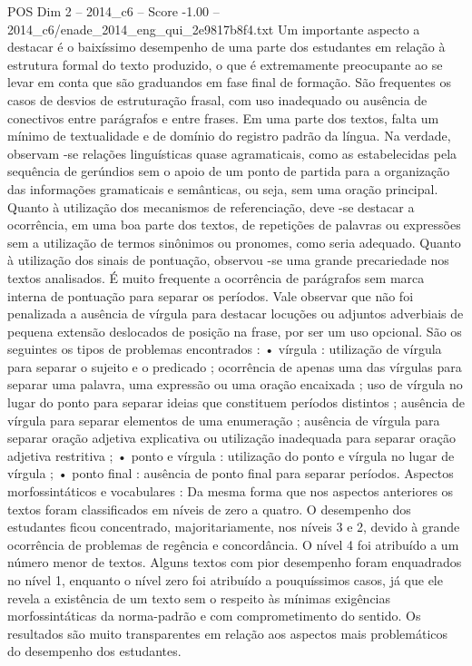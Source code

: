 \begin{textsample}{POS Dim 2 – 2014\_c6 – Score -1.00 – 2014\_c6/enade\_2014\_eng\_qui\_2e9817b8f4.txt}
Um importante aspecto a destacar é o baixíssimo desempenho de uma parte dos estudantes em relação à estrutura formal do texto produzido, o que é extremamente preocupante ao se levar em conta que são graduandos em fase final de formação.
São frequentes os casos de desvios de estruturação frasal, com uso inadequado ou ausência de conectivos entre parágrafos e entre frases.
Em uma parte dos textos, falta um mínimo de textualidade e de domínio do registro padrão da língua.
Na verdade, observam -se relações linguísticas quase agramaticais, como as estabelecidas pela sequência de gerúndios sem o apoio de um ponto de partida para a organização das informações gramaticais e semânticas, ou seja, sem uma oração principal.
Quanto à utilização dos mecanismos de referenciação, deve -se destacar a ocorrência, em uma boa parte dos textos, de repetições de palavras ou expressões sem a utilização de termos sinônimos ou pronomes, como seria adequado.
Quanto à utilização dos sinais de pontuação, observou -se uma grande precariedade nos textos analisados.
É muito frequente a ocorrência de parágrafos sem marca interna de pontuação para separar os períodos.
Vale observar que não foi penalizada a ausência de vírgula para destacar locuções ou adjuntos adverbiais de pequena extensão deslocados de posição na frase, por ser um uso opcional.
São os seguintes os tipos de problemas encontrados : • vírgula : utilização de vírgula para separar o sujeito e o predicado ; ocorrência de apenas uma das vírgulas para separar uma palavra, uma expressão ou uma oração encaixada ; uso de vírgula no lugar do ponto para separar ideias que constituem períodos distintos ; ausência de vírgula para separar elementos de uma enumeração ; ausência de vírgula para separar oração adjetiva explicativa ou utilização inadequada para separar oração adjetiva restritiva ; • ponto e vírgula : utilização do ponto e vírgula no lugar de vírgula ; • ponto final : ausência de ponto final para separar períodos.
Aspectos morfossintáticos e vocabulares : Da mesma forma que nos aspectos anteriores os textos foram classificados em níveis de zero a quatro.
O desempenho dos estudantes ficou concentrado, majoritariamente, nos níveis 3 e 2, devido à grande ocorrência de problemas de regência e concordância.
O nível 4 foi atribuído a um número menor de textos.
Alguns textos com pior desempenho foram enquadrados no nível 1, enquanto o nível zero foi atribuído a pouquíssimos casos, já que ele revela a existência de um texto sem o respeito às mínimas exigências morfossintáticas da norma-padrão e com comprometimento do sentido.
Os resultados são muito transparentes em relação aos aspectos mais problemáticos do desempenho dos estudantes.

\end{textsample}
